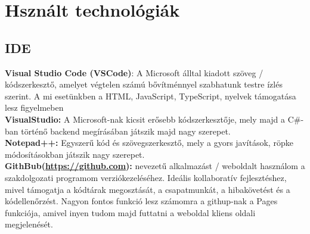 \documentclass[a4paper,12pt]{article}
\begin{document}
\section{Hsznált technológiák}
\subsection{IDE}
\textbf{Visual Studio Code (VSCode)}: A Microsoft álltal kiadott szöveg / kódszerkesztő, amelyet végtelen számú bővítménnyel szabhatunk testre ízlés szerint. A mi esetünkben a HTML, JavaScript, TypeScript, nyelvek támogatása lesz figyelmeben\bigskip
\\\textbf{VisualStudio:} A Microsoft-nak kicsit erősebb kódszerkesztője, mely majd a C\#-ban történő backend megírásában játszik majd nagy szerepet.\bigskip
\\\textbf{Notepad++:} Egyszerű kód és szövegszerkesztő, mely a gyors javítások, röpke módosításokban játszik nagy szerepet.\bigskip
\\\textbf{GithBub(\url{https://github.com}):} nevezetű alkalmazást / weboldalt használom a szakdolgozati programom verziókezeléséhez. Ideális kollaboratív fejlesztéshez, mivel támogatja a kódtárak megosztását, a csapatmunkát, a hibakövetést és a kódellenőrzést. Nagyon fontos funkció lesz számomra a githup-nak a Pages funkciója, amivel inyen tudom majd futtatni a weboldal kliens oldali megjelenését.
\end{document}

